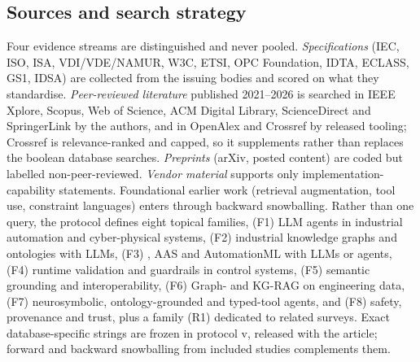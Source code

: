 \subsection{Sources and search strategy}
Four evidence streams are distinguished and never pooled. \emph{Specifications} (IEC,
ISO, ISA, VDI/VDE/NAMUR, W3C, ETSI, OPC Foundation, IDTA, ECLASS, GS1, IDSA) are collected
from the issuing bodies and scored on what they standardise. \emph{Peer-reviewed
literature} published 2021--2026 is searched in IEEE Xplore, Scopus, Web of Science, ACM
Digital Library, ScienceDirect and SpringerLink by the authors, and in OpenAlex and
Crossref by released tooling; Crossref is relevance-ranked and capped, so it supplements
rather than replaces the boolean database searches. \emph{Preprints} (arXiv, posted
content) are coded but labelled non-peer-reviewed. \emph{Vendor material} supports only
implementation-capability statements. Foundational earlier work (retrieval augmentation,
tool use, constraint languages) enters through backward snowballing. Rather than one
query, the protocol defines eight topical families, (F1) LLM agents in industrial
automation and cyber-physical systems, (F2) industrial knowledge graphs and ontologies with
LLMs, (F3) \opcua{}, AAS and AutomationML with LLMs or agents, (F4) runtime validation and
guardrails in control systems, (F5) semantic grounding and interoperability, (F6) Graph- and
KG-RAG on engineering data, (F7) neurosymbolic, ontology-grounded and typed-tool agents, and
(F8) safety, provenance and trust, plus a family (R1) dedicated to related surveys. Exact
database-specific strings are frozen in protocol v\SurveyProtocolVersion{}, released with
the article; forward and backward snowballing from included studies complements them.

